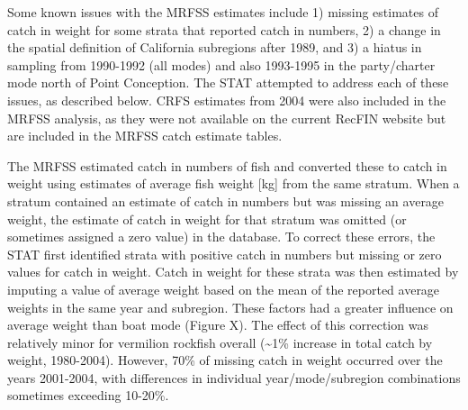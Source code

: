 \documentclass[11pt,
  english,
  a4paper,
]{article}
\begin{document}
Some known issues with the MRFSS estimates include 1) missing estimates of catch in weight for some strata that reported catch in numbers, 2) a change in the spatial definition of California subregions after 1989, and 3) a hiatus in sampling from 1990-1992 (all modes) and also 1993-1995 in the party/charter mode north of Point Conception. The STAT attempted to address each of these issues, as described below. CRFS estimates from 2004 were also included in the MRFSS analysis, as they were not available on the current RecFIN website but are included in the MRFSS catch estimate tables.

The MRFSS estimated catch in numbers of fish and converted these to catch in weight using estimates of average fish weight {[}kg{]} from the same stratum. When a stratum contained an estimate of catch in numbers but was missing an average weight, the estimate of catch in weight for that stratum was omitted (or sometimes assigned a zero value) in the database. To correct these errors, the STAT first identified strata with positive catch in numbers but missing or zero values for catch in weight. Catch in weight for these strata was then estimated by imputing a value of average weight based on the mean of the reported average weights in the same year and subregion. These factors had a greater influence on average weight than boat mode (Figure X). The effect of this correction was relatively minor for vermilion rockfish overall (\textasciitilde1\% increase in total catch by weight, 1980-2004). However, 70\% of missing catch in weight occurred over the years 2001-2004, with differences in individual year/mode/subregion combinations sometimes exceeding 10-20\%.
\end{document}
